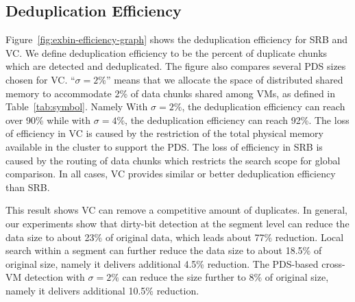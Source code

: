 \subsection{Deduplication Efficiency}



Figure~\ref{fig:exbin-efficiency-graph} shows the deduplication efficiency for SRB and VC.
We define deduplication efficiency to be the percent of duplicate chunks
which are detected and deduplicated.
The figure also compares several PDS sizes chosen for VC. ``$\sigma=2\%$'' means that
we allocate the space of distributed shared memory  to accommodate 2\%
of data chunks shared among VMs, as defined in Table~\ref{tab:symbol}. Namely 
With $\sigma=2\%$, the deduplication efficiency can reach over 90\% 
while with $\sigma=4\%$, the deduplication efficiency can reach 92\%. 
The loss of efficiency in VC is caused by the restriction of the total physical memory available
in the cluster to support the PDS.  
The loss of efficiency in SRB is caused by the routing of data chunks which restricts the search scope
for global comparison.
In all cases, VC provides similar or better deduplication efficiency than SRB.

This result shows VC can remove  a competitive amount of duplicates.
In general, our experiments show that
dirty-bit detection at the segment level  can reduce the data size to about 23\% of original data, 
which leads  about 77\% reduction.
Local search within a segment can   further reduce the data size
to about 18.5\% of original size, namely it delivers additional 4.5\% reduction.
The PDS-based cross-VM detection with $\sigma=2\% $
can reduce the  size further to 8\% of original size, namely it 
delivers additional 10.5\% reduction.


